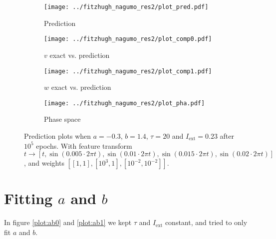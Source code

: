 \documentclass[a4paper]{article}
\begin{document}
\begin{figure}[H]
	\centering 
	\begin{subfigure}[b]{0.47\textwidth}
		\centering
		\texttt{[image: ../fitzhugh\_nagumo\_res2/plot\_pred.pdf]}
		\caption{Prediction}
		\label{fig:feature04a}
	\end{subfigure}
	\begin{subfigure}[b]{0.47\textwidth}
		\centering
		\texttt{[image: ../fitzhugh\_nagumo\_res2/plot\_comp0.pdf]}
		\caption{$v$ exact vs. prediction}
		\label{fig:feature04b}
	\end{subfigure}
	\begin{subfigure}[b]{0.47\textwidth}
		\centering
		\texttt{[image: ../fitzhugh\_nagumo\_res2/plot\_comp1.pdf]}
		\caption{$w$ exact vs. prediction}
		\label{fig:feature04c}
	\end{subfigure}
	\begin{subfigure}[b]{0.47\textwidth}
		\centering
		\texttt{[image: ../fitzhugh\_nagumo\_res2/plot\_pha.pdf]}
		\caption{Phase space}
		\label{fig:feature04d}
	\end{subfigure}
	\caption{Prediction plots when $a=-0.3$, $b=1.4$, $\tau=20$ and $ I_{\text{ext}}=0.23$ after $10^5$ epochs. With feature transform $t \rightarrow \left[  t, \sin(0.005\cdot 2 \pi t), \sin(0.01\cdot 2 \pi t), \sin(0.015\cdot 2 \pi t), \sin(0.02\cdot 2 \pi t) \right]$, and weights $\left[ \left[ 1, 1\right], \left[ 10^3, 1\right], \left[ 10^{-2}, 10^{-2}\right]\right]$.}
	\label{plot:feature04}
\end{figure}


\section{Fitting $a$ and $b$}

In figure \ref{plot:ab0} and \ref{plot:ab1} we kept $\tau$ and $I_{\text{ext}}$ constant, and tried to only fit $a$ and $b$.
\end{document}
